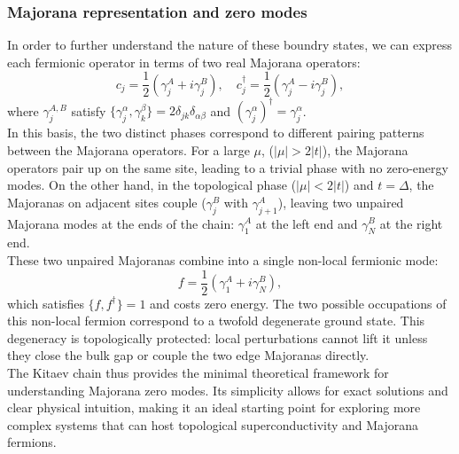 \documentclass[11pt, letterpaper, titlepage]{article}
\begin{document}
\subsubsection{Majorana representation and zero modes}
In order to further understand the nature of these boundry states, we can express each fermionic operator in terms of two real Majorana operators:
\begin{equation}
c_j = \frac{1}{2}(\gamma_j^A + i\gamma_j^B), \quad
c_j^\dagger = \frac{1}{2}(\gamma_j^A - i\gamma_j^B),
\end{equation}
where $\gamma_j^{A,B}$ satisfy $\{\gamma_j^\alpha, \gamma_k^\beta\} = 2\delta_{jk}\delta_{\alpha\beta}$ and $(\gamma_j^\alpha)^\dagger = \gamma_j^\alpha$.\\
In this basis, the two distinct phases correspond to different pairing patterns between the Majorana operators. For a large $μ$, ($|μ| > 2|t|$), the Majorana operators pair up on the same site, leading to a trivial phase with no zero-energy modes. On the other hand, in the topological phase ($|μ| < 2|t|$) and $t = Δ$, the Majoranas on adjacent sites couple ($\gamma_j^B$ with $\gamma_{j+1}^A$), leaving two unpaired Majorana modes at the ends of the chain: $\gamma_1^A$ at the left end and $\gamma_N^B$ at the right end.\\
These two unpaired Majoranas combine into a single non-local fermionic mode:
\begin{equation}
  f = \frac{1}{2 }(\gamma_1^A + i\gamma_N^B),
\end{equation}
which satisfies $\{f, f^\dagger\} = 1$ and costs zero energy. The two possible occupations of this non-local fermion correspond to a twofold degenerate ground state. This degeneracy is topologically protected: local perturbations cannot lift it unless they close the bulk gap or couple the two edge Majoranas directly.\\
The Kitaev chain thus provides the minimal theoretical framework for understanding Majorana zero modes. Its simplicity allows for exact solutions and clear physical intuition, making it an ideal starting point for exploring more complex systems that can host topological superconductivity and Majorana fermions.
\end{document}
